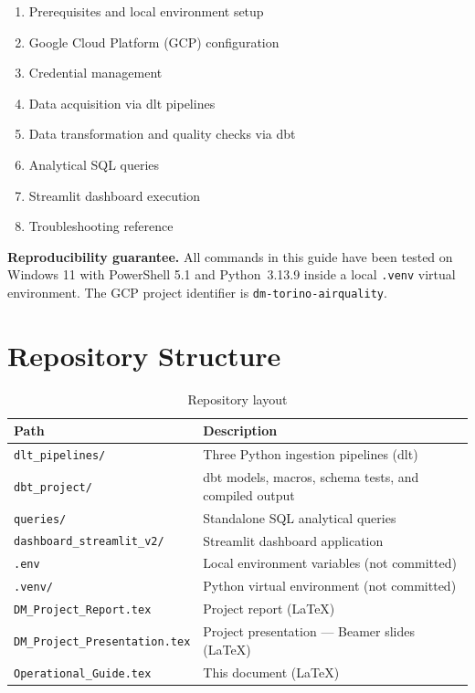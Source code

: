 \documentclass[11pt,a4paper]{article}
\begin{document}
\begin{enumerate}
  \item Prerequisites and local environment setup
  \item Google Cloud Platform (GCP) configuration
  \item Credential management
  \item Data acquisition via dlt pipelines
  \item Data transformation and quality checks via dbt
  \item Analytical SQL queries
  \item Streamlit dashboard execution
  \item Troubleshooting reference
\end{enumerate}

\begin{tcolorbox}[infobox]
\textbf{Reproducibility guarantee.}
All commands in this guide have been tested on Windows 11 with PowerShell 5.1
and Python~3.13.9 inside a local \texttt{.venv} virtual environment.
The GCP project identifier is \texttt{dm-torino-airquality}.
\end{tcolorbox}

\section{Repository Structure}

\begin{table}[h!]
\centering
\caption{Repository layout}
\small
\begin{tabularx}{\textwidth}{@{}lX@{}}
\toprule
\textbf{Path} & \textbf{Description} \\
\midrule
\rowcolor{lightbg}
\texttt{dlt\_pipelines/} & Three Python ingestion pipelines (dlt) \\
\texttt{dbt\_project/}   & dbt models, macros, schema tests, and compiled output \\
\rowcolor{lightbg}
\texttt{queries/}        & Standalone SQL analytical queries \\
\texttt{dashboard\_streamlit\_v2/} & Streamlit dashboard application \\
\rowcolor{lightbg}
\texttt{.env}            & Local environment variables (not committed) \\
\texttt{.venv/}          & Python virtual environment (not committed) \\
\rowcolor{lightbg}
\texttt{DM\_Project\_Report.tex}       & Project report (LaTeX) \\
\texttt{DM\_Project\_Presentation.tex} & Project presentation — Beamer slides (LaTeX) \\
\rowcolor{lightbg}
\texttt{Operational\_Guide.tex}        & This document (LaTeX) \\
\bottomrule
\end{tabularx}
\end{table}
\end{document}
